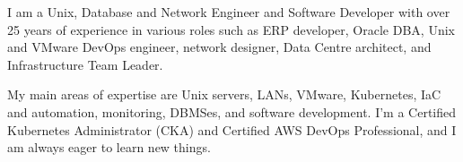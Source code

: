 
I am a Unix, Database and Network Engineer and Software Developer with over 25 years of experience in various roles such as ERP developer, Oracle DBA, Unix and VMware DevOps engineer, network designer, Data Centre architect, and Infrastructure Team Leader.
\par
My main areas of expertise are Unix servers, LANs, VMware, Kubernetes, IaC and automation, monitoring, DBMSes, and software development. I'm a Certified Kubernetes Administrator (CKA) and Certified AWS DevOps Professional, and I am always eager to learn new things.
